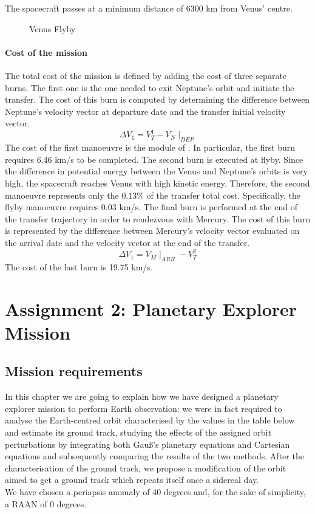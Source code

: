 \documentclass[11pt,a4paper]{report}
\begin{document}
The spacecraft passes at a minimum distance of 6300 km from Venus’ centre.

\begin{figure}[H]
\centering
{}
    \caption{Venus Flyby}
\end{figure}

\subsection{Cost of the mission}

The total cost of the mission is defined by adding the cost of three separate burns. 
The first one is the one needed to exit Neptune’s orbit and initiate the transfer. The cost of this burn is computed by determining the difference between Neptune’s velocity vector at departure date and the transfer initial velocity vector.
\begin{equation*}
    \Delta V_1 = V_T^1 - V_{N}\mid_{DEP}
\end{equation*}
The cost of the first manoeuvre is the module of . In particular, the first burn requires 6.46 km/s to be completed.
The second burn is executed at flyby. Since the difference in potential energy between the Venus and Neptune’s orbits is very high, the spacecraft reaches Venus with high kinetic energy. Therefore, the second manoeuvre represents only the $0.13\%$ of the transfer total cost. Specifically, the flyby manoeuvre requires 0.03 km/s.
The final burn is performed at the end of the transfer trajectory in order to rendezvous with Mercury. The cost of this burn is represented by the difference between Mercury’s velocity vector evaluated on the arrival date and the velocity vector at the end of the transfer.
\begin{equation*}
    \Delta V_1 = V_{M}\mid_{ARR}- V_T^2
\end{equation*}
The cost of the last burn is 19.75 km/s.

\part{Assignment 2: Planetary Explorer Mission}

\chapter{Mission requirements}
In this chapter we are going to explain how we have designed a planetary explorer
mission to perform Earth observation: we were in fact required to analyse the Earth-centred orbit characterised by the values in the table below and estimate its ground track, studying the effects of the assigned orbit perturbations by integrating both Gauß’s planetary equations and Cartesian equations and subsequently comparing the results of the two methods. After the characterisation of the ground track, we propose a modification of the orbit aimed to get a ground track which repeats itself once a sidereal day.\\
We have chosen a periapsis anomaly of 40 degrees and, for the sake of simplicity, a RAAN of 0 degrees.
\end{document}

